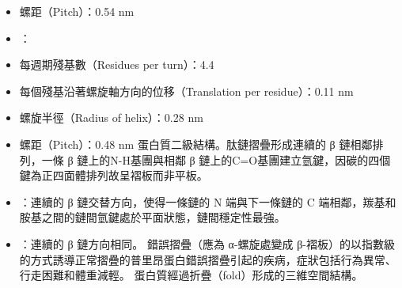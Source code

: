 \documentclass[a4paper,12pt]{report}
\begin{document}
\begin{itemize}
\begin{itemize}
\item 螺距（Pitch）：0.54 nm
\eit
\item {}：
\bit
\item 每週期殘基數（Residues per turn）：4.4
\item 每個殘基沿著螺旋軸方向的位移（Translation per residue）：0.11 nm
\item 螺旋半徑（Radius of helix）：0.28 nm
\item 螺距（Pitch）：0.48 nm
\eit
\eit
{}
蛋白質二級結構。肽鏈摺疊形成連續的 β 鏈相鄰排列，一條 β 鏈上的N-H基團與相鄰 β 鏈上的C=O基團建立氫鍵，因碳的四個鍵為正四面體排列故呈褶板而非平板。
\bit
\item {}：連續的 β 鏈交替方向，使得一條鏈的 N 端與下一條鏈的 C 端相鄰，羰基和胺基之間的鏈間氫鍵處於平面狀態，鏈間穩定性最強。
\item {}：連續的 β 鏈方向相同。
\eit
{}
錯誤摺疊（應為 α-螺旋處變成 β-褶板）的以指數級的方式誘導正常摺疊的普里昂蛋白錯誤摺疊引起的疾病，症狀包括行為異常、行走困難和體重減輕。
蛋白質經過折疊（fold）形成的三維空間結構。


\end{itemize}
\end{itemize}
\end{document}
